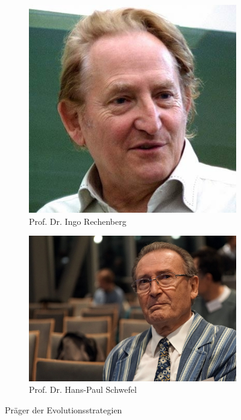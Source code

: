 \begin{figure}[H]
\centering
\begin{subfigure}[b]{0.45\linewidth}
\centering
\includegraphics[height=0.6\textwidth]{img/Prof-Dr-Ingo-Rechenberg.jpg}
\caption[Prof. Dr. Ingo Rechenberg]{Prof. Dr. Ingo Rechenberg\protect\footnotemark}
\label{fig:ingorechenberg}
\end{subfigure}
\hfill
\begin{subfigure}[b]{0.45\linewidth}
\centering
\includegraphics[height=0.6\textwidth]{img/Prof_Dr_Hans-Paul_Schwefel.jpg}
\caption[Prof. Dr. Hans-Paul Schwefel]{Prof. Dr. Hans-Paul Schwefel\protect\footnotemark}
\label{fig:hanspaulschwefel}
\end{subfigure}
\caption{Präger der Evolutionsstrategien}
\label{fig:praeger_der_evolutionsstrategien}
\end{figure}


